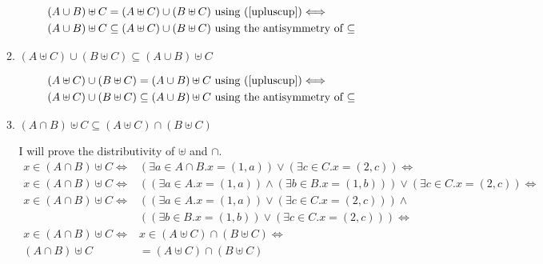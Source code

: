 \documentclass[10pt,\jkfside,a4paper]{article}
\begin{document}
\begin{enumerate}
\begin{enumerate}
\begin{equation}
\begin{split}
(A \cup B) \uplus C &= (A \uplus C) \cup (B \uplus C) \text{ using (\ref{upluscup})}\Longleftrightarrow\\
(A \cup B) \uplus C &\subseteq (A \uplus C) \cup (B \uplus C) \text{ using the antisymmetry of $\subseteq$}\\
\end{split}
\end{equation}

\item $(A \uplus C) \cup (B \uplus C) \subseteq (A \cup B) \uplus C$

\begin{equation}
\begin{split}
(A \uplus C) \cup (B \uplus C) &= (A \cup B) \uplus C \text{ using (\ref{upluscup})}\Longleftrightarrow\\
(A \uplus C) \cup (B \uplus C) &\subseteq (A \cup B) \uplus C \text{ using the antisymmetry of $\subseteq$}\\
\end{split}
\end{equation}

\item $(A \cap B) \uplus C \subseteq (A \uplus C) \cap (B \uplus C)$

I will prove the distributivity of $\uplus$ and $\cap$.
\begin{equation}\label{upluscap}
\begin{split}
x \in (A \cap B) \uplus C \Longleftrightarrow& (\exists a \in A \cap B. x = (1, a)) \vee (\exists c \in C. x = (2, c)) \Longleftrightarrow\\
x \in (A \cap B) \uplus C \Longleftrightarrow& ((\exists a \in A. x = (1, a)) \wedge (\exists b \in B. x = (1, b))) \vee (\exists c \in C. x = (2, c)) \Longleftrightarrow\\
x \in (A \cap B) \uplus C \Longleftrightarrow& ((\exists a \in A. x = (1, a)) \vee (\exists c \in C. x = (2, c))) \wedge \\
											 & ((\exists b \in B. x = (1, b)) \vee (\exists c \in C. x = (2, c))) \Longleftrightarrow\\
x \in (A \cap B) \uplus C \Longleftrightarrow& x \in (A \uplus C) \cap (B \uplus C) \Longleftrightarrow\\
(A \cap B) \uplus C &= (A \uplus C) \cap (B \uplus C)\\
\end{split}
\end{equation}


\end{enumerate}
\end{enumerate}
\end{document}
